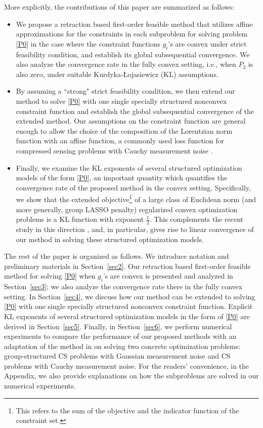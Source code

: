 \documentclass[10pt]{article}
\numberwithin{equation}{section}
\begin{document}
More explicitly, the contributions of this paper are summarized as follows:
\begin{itemize}
  \item We propose a retraction based first-order feasible method that utilizes affine approximations for the constraints in each subproblem for solving problem \eqref{P0} in the case where the constraint functions $g_i$'s are convex under strict feasibility condition, and establish its global subsequential convergence. We also analyze the convergence rate in the fully convex setting, i.e., when $P_2$ is also zero, under suitable Kurdyka-{\L}ojasiewicz (KL) assumptions.
  \item By assuming a ``strong" strict feasibility condition, we then extend our method to solve \eqref{P0} with one single specially structured nonconvex constraint function and establish the global subsequential convergence of the extended method. Our assumptions on the constraint function are general enough to allow the choice of the composition of the Lorentzian norm function with an affine function, a commonly used loss function for compressed sensing problems with Cauchy measurement noise \cite{CaBA10}.
  \item Finally, we examine the KL exponents of several structured optimization models of the form \eqref{P0}, an important quantity which quantifies the convergence rate of the proposed method in the convex setting. Specifically, we show that the extended objective\footnote{This refers to the sum of the objective and the indicator function of the constraint set.} of a large class of Euclidean norm (and more generally, group LASSO penalty) regularized convex optimization problems is a KL function with exponent $\frac12$. This complements the recent study in this direction \cite{LiPong18,YuLiPo19,YuLP20,ZYuP20}, and, in particular, gives rise to linear convergence of our method in solving these structured optimization models.
\end{itemize}

The rest of the paper is organized as follows. We introduce notation and preliminary materials in Section~\ref{sec2}. Our retraction based first-order feasible method for solving \eqref{P0} when $g_i$'s are convex is presented and analyzed in Section~\ref{sec3}; we also analyze the convergence rate there in the fully convex setting. In Section~\ref{sec4}, we discuss how our method can be extended to solving \eqref{P0} with one single specially structured nonconvex constraint function. Explicit KL exponents of several structured optimization models in the form of \eqref{P0} are derived in Section~\ref{sec5}. Finally, in Section~\ref{sec6}, we perform numerical experiments to compare the performance of our proposed methods with an adaptation of the method in \cite{Au13} on solving two concrete optimization problems: group-structured CS problems with Gaussian measurement noise and CS problems with Cauchy measurement noise. For the readers' convenience, in the Appendix, we also provide explanations on how the subproblems are solved in our numerical experiments.
\end{document}
